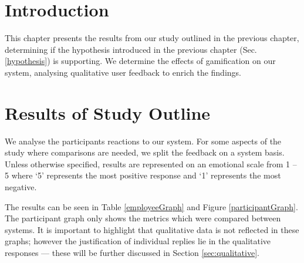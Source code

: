 \section{Introduction}
This chapter presents the results from our study outlined in the previous chapter, determining if the hypothesis introduced in the previous chapter (Sec. \ref{hypothesis}) is supporting. We determine the effects of gamification on our system, analysing qualitative user feedback to enrich the findings.
\section{Results of Study Outline}
We analyse the participants reactions to our system. For some aspects of the study where comparisons are needed, we split the feedback on a system basis. Unless otherwise specified, results are represented on an emotional scale from 1 -- 5 where `5' represents the most positive response and `1' represents the most negative.

The results can be seen in Table \ref{employeeGraph} and Figure \ref{participantGraph}. The participant graph only shows the metrics which were compared between systems. It is important to highlight that qualitative data is not reflected in these graphs; however the justification of individual replies lie in the qualitative responses --- these will be further discussed in Section \ref{sec:qualitative}.

\begin{table}[h]
     \caption{A table depicting the different type of loyalty schemes available at the locations the study was run in}
     \label{employeeGraph}
\end{table}


